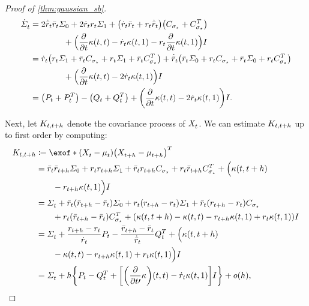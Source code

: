 \begin{proof}[Proof of \cref{thm:gaussian_sb}]
\begin{align}
\nn
\dSigmasol &= 2 \dratioc\ratioc \covar + 2 \dratio\ratio \covaralt + \parens*{  \dratio\ratioc + \ratio\dratioc } \parens*{ \Cs + \Cs^T } \\
\nn
&\qquad\qquad+ \Big(  \frac{\del}{\del \ctime} \kernel[\ctime][\ctime] - \dratio \kernel[\ctime][\horizon] - \ratio \frac{\del}{\del \ctime} \kernel[\ctime][\horizon]  \Big)\eye \\
\nn
&= \dratio \parens*{   \ratio \covaralt + \ratioc \Cs + \ratio \covaralt + \ratioc \Cs^T   } + \dratioc \parens*{   \ratioc \covar + \ratio \Cs + \ratioc \covar + \ratio \Cs^T   } \\
\nn
&\qquad\qquad+ \Big(  \frac{\del}{\del \ctime} \kernel[\ctime][\ctime] -2 \dratio \kernel[\ctime][\horizon]  \Big)\eye\\
\label{eq:dsigmasol}
&= \parens*{ \Pt + \Pt^T  } - \parens*{ \Qt + \Qt^T  } + \parens*{  \frac{\del}{\del \ctime} \kernel[\ctime][\ctime] -2 \dratio \kernel[\ctime][\horizon]  }\eye.
\end{align}


Next, let $K_{t,t + h}$ denote the covariance process of $X^{}_{ t }$. We can estimate $K_{t,t + h}$ up to first order by computing:
\begin{align}
\nn
K_{\ctime, \ctime + h} &\defeq \exof*{  \parens*{\Xsol-\meansol} \parens*{\Xsol[\ctime+h]-\meansol[\ctime+h]}^T    } \\
\nn
&=  \ratioc\ratioc[\ctime+h] \covar + \ratio \ratio[\ctime+h] \covaralt + \ratioc \ratio[\ctime+h] \Cs + \ratio\ratioc[\ctime+h]\Cs^T  
+ \Big( \kernel[\ctime][\ctime+h] \\
\nn
&\qquad- \ratio[\ctime+h] \kernel[\ctime][\horizon] \Big) \eye \\
\nn
&= \Sigmasol + \ratioc(\ratioc[\ctime+h]-\ratioc) \covar + \ratio(\ratio[\ctime+h] - \ratio) \covaralt + \ratioc(\ratio[\ctime+h] - \ratio) \Cs \\
\nn
&\qquad+ \ratio( \ratioc[\ctime+h] -\ratioc) \Cs^T  + \parens*{ \kernel[\ctime][\ctime+h] - \kernel[\ctime][\ctime] - \ratio[\ctime+h] \kernel[\ctime][\horizon] + \ratio\kernel[\ctime][\horizon] }\eye \\
\nn
&= \Sigmasol + \frac{\ratio[\ctime+h] - \ratio}{\dratio} \Pt - \frac{\ratioc[\ctime+h] - \ratioc}{\dratioc} \Qt^T  + \Big( \kernel[\ctime][\ctime+h] \\
\nn
&\qquad- \kernel[\ctime][\ctime] - \ratio[\ctime+h] \kernel[\ctime][\horizon] + \ratio\kernel[\ctime][\horizon] \Big)\eye \\
\label{eq:hold5}
&= \Sigmasol + h \braces*{  \Pt - \Qt^T  +  \bracks*{ \parens*{\frac{\del}{\del \ctime\prime}\kernelbase }(\ctime, \ctime) - \dratio \kernel[\ctime][\horizon] } \eye } + o(h),
\end{align}


\end{proof}
